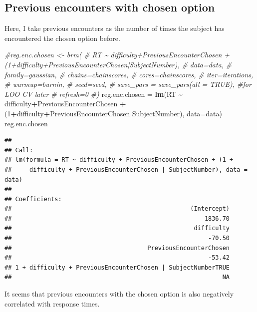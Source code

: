 \documentclass[
]{book}
\newenvironment{Shaded}{\begin{snugshade}}{\end{snugshade}}
\newcommand{\AttributeTok}[1]{\textcolor[rgb]{0.13,0.29,0.53}{#1}}
\newcommand{\CommentTok}[1]{\textcolor[rgb]{0.56,0.35,0.01}{\textit{#1}}}
\newcommand{\DecValTok}[1]{\textcolor[rgb]{0.00,0.00,0.81}{#1}}
\newcommand{\FunctionTok}[1]{\textcolor[rgb]{0.13,0.29,0.53}{\textbf{#1}}}
\newcommand{\NormalTok}[1]{#1}
\newcommand{\OtherTok}[1]{\textcolor[rgb]{0.56,0.35,0.01}{#1}}
\newcommand{\SpecialCharTok}[1]{\textcolor[rgb]{0.81,0.36,0.00}{\textbf{#1}}}
\begin{document}
\hypertarget{previous-encounters-with-chosen-option}{%
\subsection{Previous encounters with chosen option}\label{previous-encounters-with-chosen-option}}

Here, I take previous encounters as the number of times the subject has encountered the chosen option before.

\begin{Shaded}
\begin{Highlighting}[]
\CommentTok{\#reg.enc.chosen \textless{}{-} brm(}
\CommentTok{\#  RT \textasciitilde{} difficulty+PreviousEncounterChosen + (1+difficulty+PreviousEncounterChosen|SubjectNumber),}
\CommentTok{\#  data=data,}
\CommentTok{\#  family=gaussian,}
\CommentTok{\#  chains=chainscores,}
\CommentTok{\#  cores=chainscores,}
\CommentTok{\#  iter=iterations,}
\CommentTok{\#  warmup=burnin,}
\CommentTok{\#  seed=seed,}
\CommentTok{\#  save\_pars = save\_pars(all = TRUE), \#for LOO CV later}
\CommentTok{\#  refresh=0}
\CommentTok{\#)}
\NormalTok{reg.enc.chosen }\OtherTok{=} \FunctionTok{lm}\NormalTok{(RT }\SpecialCharTok{\textasciitilde{}}\NormalTok{ difficulty}\SpecialCharTok{+}\NormalTok{PreviousEncounterChosen }\SpecialCharTok{+}\NormalTok{ (}\DecValTok{1}\SpecialCharTok{+}\NormalTok{difficulty}\SpecialCharTok{+}\NormalTok{PreviousEncounterChosen}\SpecialCharTok{|}\NormalTok{SubjectNumber), }\AttributeTok{data=}\NormalTok{data)}
\NormalTok{reg.enc.chosen}
\end{Highlighting}
\end{Shaded}

\begin{verbatim}
## 
## Call:
## lm(formula = RT ~ difficulty + PreviousEncounterChosen + (1 + 
##     difficulty + PreviousEncounterChosen | SubjectNumber), data = data)
## 
## Coefficients:
##                                                  (Intercept)  
##                                                      1836.70  
##                                                   difficulty  
##                                                       -70.50  
##                                      PreviousEncounterChosen  
##                                                       -53.42  
## 1 + difficulty + PreviousEncounterChosen | SubjectNumberTRUE  
##                                                           NA
\end{verbatim}

It seems that previous encounters with the chosen option is also negatively correlated with response times.
\end{document}
